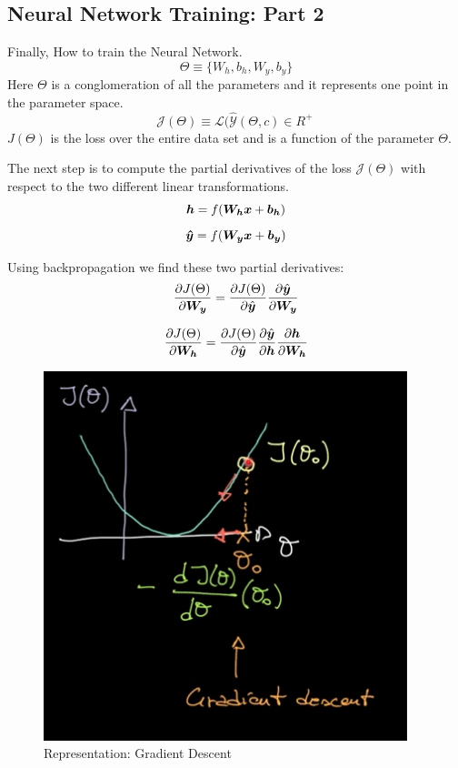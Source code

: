 \subsection{Neural Network Training: Part 2}
Finally, How to train the Neural Network. 
\[\Theta \equiv \{ W_h, b_h , W_y, b_y \} \]
Here $\Theta$ is  a conglomeration of all the parameters and it represents one point in the parameter space.  
\[
   \mathcal{J}(\Theta) \equiv \mathcal{L}(\hat{\mathcal{Y}}(\Theta,c) \in R^+\
\]
$J(\Theta)$ is the loss over the entire data set and is a function of the parameter $\Theta$.

The next step is to compute the partial derivatives of the loss $\mathcal{J}(\Theta)$ with respect to the two different linear transformations. 
\[\bm{h} = f(\bm{W_h} \bm{x} + \bm{b_h})\]
\[\bm{\hat{y}} = f(\bm{W_y} \bm{x} + \bm{b_y})\]

Using backpropagation we find these two partial derivatives:
\[
    \frac{\partial J(\Theta)}{\partial \bm{W_y}} = 
    \frac{\partial J(\Theta)}{\partial \hat{\bm{y}}}
    \frac{\partial \hat{\bm{y}}}{\partial \bm{W_y}}
\]
    
\[\frac{\partial J(\Theta)}{\partial \matr{W_h}} =
\frac{\partial J(\Theta)}{\partial \hat{\vect{y}}}
\frac{\partial \hat{\vect{y}}}{\partial \matr{h}}
\frac{\partial \matr{h}}{\partial \matr{W_h}}

\]


\begin{figure}[ht]
    \centering
    \includegraphics[width=300pt]{labs/02/images/gradient_descent.jpg}
    \caption{Representation: Gradient Descent}
    \label{fig:gradient_descent}
\end{figure}

